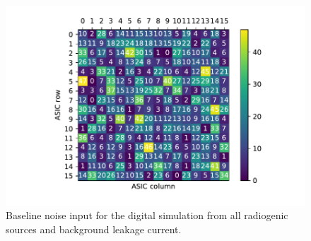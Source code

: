 \begin{figure}[]
\centering
\includegraphics[width=\textwidth]{images/localHitsRadiogenic.pdf}
\caption{Baseline noise input for the digital simulation from all radiogenic sources and background leakage current.}
\end{figure}~\label{fig:reference_input_noise}

